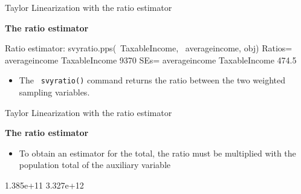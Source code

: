\documentclass[11pt,german,hideothersubsections]{beamer}
\newcommand{\R}[1]{{\tt \color{blue}  #1}}
\begin{document}
\begin{frame}[fragile]{Taylor Linearization} {with the ratio estimator}
\footnotesize{
\begin{center}
\textbf{The ratio estimator}
\end{center}
\begin{Schunk}
\begin{Soutput}
Ratio estimator: svyratio.pps(~TaxableIncome, ~averageincome, obj)
Ratios=
              averageincome
TaxableIncome          9370
SEs=
              averageincome
TaxableIncome         474.5
\end{Soutput}
\end{Schunk}
\begin{itemize}
\item The \R{svyratio()} command returns the ratio between the two weighted sampling variables.
\end{itemize}
}
\end{frame}
\begin{frame}[fragile]{Taylor Linearization} {with the ratio estimator}
\footnotesize{
\begin{center}
\textbf{The ratio estimator}
\end{center}
\begin{itemize}
\item To obtain an estimator for the total, the ratio must be multiplied with the population total of the auxiliary variable
\end{itemize}

\begin{Schunk}
\begin{Soutput}
[1] 1.385e+11 3.327e+12
\end{Soutput}
\end{Schunk}

}
\end{frame}
\end{document}
